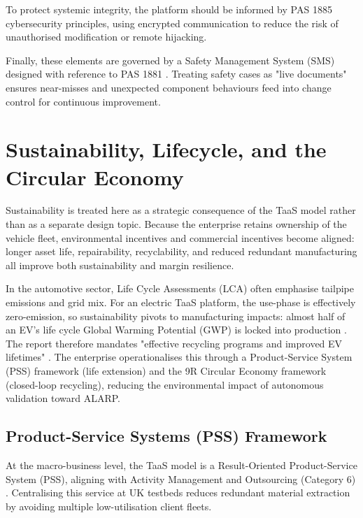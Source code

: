 \documentclass[11pt, a4paper]{report}
\numberwithin{equation}{section}
\begin{document}
\begin{refsection}
To protect systemic integrity, the platform should be informed by PAS 1885 \cite{pas1885} cybersecurity principles, using encrypted communication to reduce the risk of unauthorised modification or remote hijacking.

Finally, these elements are governed by a Safety Management System (SMS) designed with reference to PAS 1881 \cite{pas1881}. Treating safety cases as "live documents" ensures near-misses and unexpected component behaviours feed into change control for continuous improvement.

\section{Sustainability, Lifecycle, and the Circular Economy}
\label{sec:ch7-sustainability}
Sustainability is treated here as a strategic consequence of the TaaS model rather than as a separate design topic. Because the enterprise retains ownership of the vehicle fleet, environmental incentives and commercial incentives become aligned: longer asset life, repairability, recyclability, and reduced redundant manufacturing all improve both sustainability and margin resilience.

In the automotive sector, Life Cycle Assessments (LCA) often emphasise tailpipe emissions and grid mix. For an electric TaaS platform, the use-phase is effectively zero-emission, so sustainability pivots to manufacturing impacts: almost half of an EV's life cycle Global Warming Potential (GWP) is locked into production \cite[p.~56]{hawkins_2013}. The report therefore mandates "effective recycling programs and improved EV lifetimes" \cite[p.~61]{hawkins_2013}. The enterprise operationalises this through a Product-Service System (PSS) framework (life extension) and the 9R Circular Economy framework (closed-loop recycling), reducing the environmental impact of autonomous validation toward ALARP.

\subsection{Product-Service Systems (PSS) Framework}

At the macro-business level, the TaaS model is a Result-Oriented Product-Service System (PSS), aligning with Activity Management and Outsourcing (Category 6) \cite[p.~254]{tukker}. Centralising this service at UK testbeds reduces redundant material extraction by avoiding multiple low-utilisation client fleets.


\end{refsection}
\end{document}
